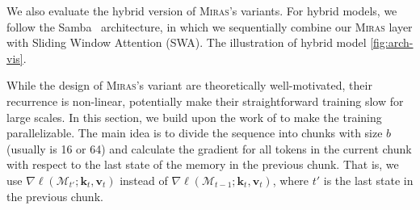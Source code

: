 \documentclass{article}
\newcommand{\citep}{\parencite}
\newcommand{\citet}{\textcite}
\newcommand{\framework}[0]{\textsc{Miras}}
\newcommand{\vk}[0]{\mathbf{k}}
\newcommand{\vvv}[0]{\mathbf{v}}
\newcommand{\M}[0]{\mathcal{M}}
\theoremstyle{plain}
\theoremstyle{definition}
\theoremstyle{remark}
\newcommand{\head}[1]{\vspace{1.7mm}\noindent{{\textcolor{c2}{\bf #1.}}}}
\begin{document}
\head{Hybrid Models} We also evaluate the hybrid version of \framework's variants. For hybrid models, we follow the Samba~\citep{ren2024samba} architecture, in which we sequentially combine our \framework{} layer with Sliding Window Attention (SWA). The illustration of hybrid model \autoref{fig:arch-vis}. 

\head{Parallelizable Training}
While the design of \framework's variant are theoretically well-motivated, their recurrence is non-linear, potentially make their straightforward training slow for large scales. In this section, we build upon the work of \citet{behrouz2024titans, sun2024learning} to make the training parallelizable. The main idea is to divide the sequence into chunks with size $b$ (usually is 16 or 64) and calculate the gradient for all tokens in the current chunk with respect to the last state of the memory in the previous chunk. That is, we use $\nabla \ell(\M_{t'}; \vk_t, \vvv_t)$ instead of $\nabla \ell(\M_{t-1}; \vk_t, \vvv_t)$, where $t'$ is the last state in the previous chunk. 
\end{document}
